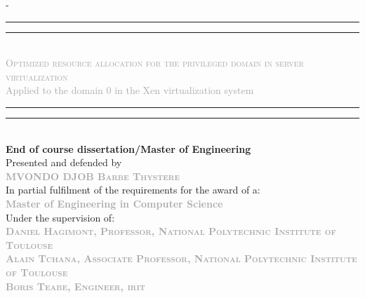 \begin{titlingpage}
\begin{SingleSpace}
\begin{adjustwidth*}{\unitlength}{-\unitlength}
\begin{center}
\end{center}
\hspace{3cm}
\vspace{0.3cm}
\begin{center}
\rule[0.5ex]{\linewidth}{2pt}\vspace*{-\baselineskip}\vspace*{3.2pt}
\rule[0.5ex]{\linewidth}{1pt}\\[\baselineskip]
{\LARGE {\textcolor{darkgray}{\textsc{ Optimized resource allocation for the privileged domain in server virtualization }}
} }\\[4mm]
{\Large \textcolor{darkgray}{Applied to the domain 0 in the Xen virtualization system}}\\
\rule[0.5ex]{\linewidth}{1pt}\vspace*{-\baselineskip}\vspace{3.2pt}
\rule[0.5ex]{\linewidth}{2pt}\\
\vspace{4mm}
{\Large \textbf{End of course dissertation/Master of Engineering}}\\
\vspace{4mm}
{\Large Presented and defended by } \\
\vspace{4mm}
{\large \textsc{\textbf{\textcolor{darkgray}{MVONDO DJOB Barbe Thystere}}}}\\
\vspace{6mm}
{\Large In partial fulfilment of the requirements for the award of a:} \\
\vspace{4mm}
{\large \textbf{\textcolor{darkgray}{Master of Engineering in Computer Science}}}\\
\vspace{4mm}
{\Large Under the supervision of:}\\
\vspace{4mm}
{\normalsize \textsc{\textbf{\textcolor{darkgray}{Daniel Hagimont, Professor, National Polytechnic Institute of Toulouse}}}}\\
\vspace{4.5mm}
{\normalsize \textsc{\textbf{\textcolor{darkgray}{Alain Tchana, Associate Professor, National Polytechnic Institute of Toulouse}}}}\\
\vspace{4.5mm}
{\normalsize \textsc{\textbf{\textcolor{darkgray}{Boris Teabe, Engineer, \acrlong{irit}}}}} \\
\vspace{4.5mm}

\end{center}
\end{adjustwidth*}
\end{SingleSpace}
\end{titlingpage}
